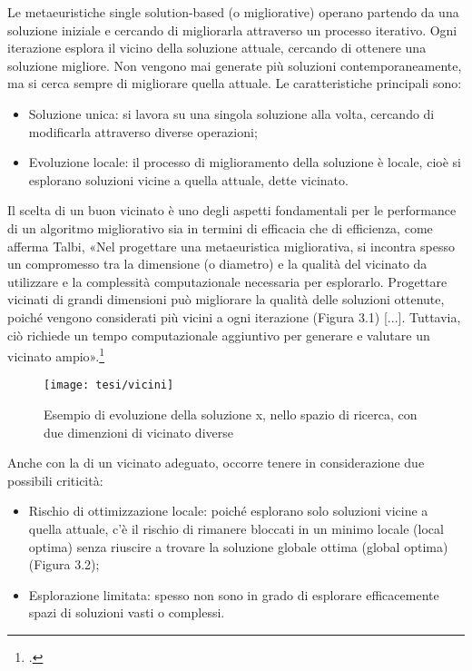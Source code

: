 Le metaeuristiche single solution-based (o migliorative) operano partendo da una soluzione iniziale e cercando di migliorarla attraverso un processo iterativo. Ogni iterazione esplora il vicino della soluzione attuale, cercando di ottenere una soluzione migliore. Non vengono mai generate più soluzioni contemporaneamente, ma si cerca sempre di migliorare quella attuale. Le caratteristiche principali sono:
\begin{itemize}
    \item Soluzione unica: si lavora su una singola soluzione alla volta, cercando di modificarla attraverso diverse operazioni;
    \item Evoluzione locale: il processo di miglioramento della soluzione è locale, cioè si esplorano soluzioni vicine a quella attuale, dette vicinato.
\end{itemize}

Il scelta di un buon vicinato è uno degli aspetti fondamentali per le performance di un algoritmo migliorativo sia in termini di efficacia che di efficienza, come afferma Talbi, «Nel progettare una metaeuristica migliorativa, si incontra spesso un compromesso tra la dimensione (o diametro) e la qualità del vicinato da utilizzare e la complessità computazionale necessaria per esplorarlo. Progettare vicinati di grandi dimensioni può migliorare la qualità delle soluzioni ottenute, poiché vengono considerati più vicini a ogni iterazione (Figura 3.1) [...]. Tuttavia, ciò richiede un tempo computazionale aggiuntivo per generare e valutare un vicinato ampio».\footcite{talbi:ssb}
\begin{figure}[!ht] 
    \centering 
    \texttt{[image: tesi/vicini]} 
    \caption{Esempio di evoluzione della soluzione x, nello spazio di ricerca, con due dimenzioni di vicinato diverse}
\end{figure}

Anche con la di un vicinato adeguato, occorre tenere in considerazione due possibili criticità:
\begin{itemize}
    \item Rischio di ottimizzazione locale: poiché esplorano solo soluzioni vicine a quella attuale, c'è il rischio di rimanere bloccati in un minimo locale (local optima) senza riuscire a trovare la soluzione globale ottima (global optima) (Figura 3.2);
    \item Esplorazione limitata: spesso non sono in grado di esplorare efficacemente spazi di soluzioni vasti o complessi.
\end{itemize}

